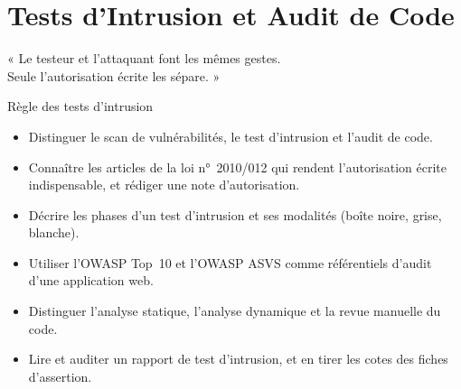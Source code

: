 
\chapter{Tests d'Intrusion et Audit de Code}
\label{chap:intrusion}

\epigraph{%
    « Le testeur et l'attaquant font les mêmes gestes.\\
    Seule l'autorisation écrite les sépare. »%
}{Règle des tests d'intrusion}


\begin{boxobjectifs}
\begin{itemize}
    \item Distinguer le scan de vulnérabilités, le test d'intrusion et
          l'audit de code.
    \item Connaître les articles de la loi n°~2010/012 qui rendent
          l'autorisation écrite indispensable, et rédiger une note
          d'autorisation.
    \item Décrire les phases d'un test d'intrusion et ses modalités (boîte
          noire, grise, blanche).
    \item Utiliser l'OWASP Top~10 et l'OWASP ASVS comme référentiels
          d'audit d'une application web.
    \item Distinguer l'analyse statique, l'analyse dynamique et la revue
          manuelle du code.
    \item Lire et auditer un rapport de test d'intrusion, et en tirer les
          cotes des fiches d'assertion.
\end{itemize}
\end{boxobjectifs}


